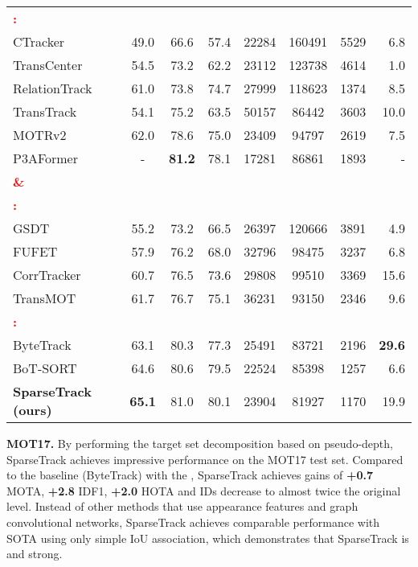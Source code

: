 \begin{table}[t]
{\begin{tabular}{ l | c c c c c c r}
\midrule
\textcolor{red}{\textbf{ :}}\\
CTracker\cite{ctracker}  & 49.0 & 66.6 & 57.4& 22284 & 160491 & 5529 & 6.8\\
TransCenter\cite{transcenter} & 54.5 & 73.2 & 62.2 & 23112 & 123738 & 4614 & 1.0\\
RelationTrack\cite{relationtrack} & 61.0 & 73.8 & 74.7 & 27999 & 118623 & 1374 & 8.5\\
TransTrack\cite{transtrack} & 54.1 & 75.2 & 63.5 & 50157 & 86442 & 3603 & 10.0\\
MOTRv2\cite{motrv2} & 62.0 & 78.6 & 75.0 & 23409 & 94797 & 2619 & 7.5\\
P3AFormer\cite{p3aformer} & - & \textbf{81.2} & 78.1 & 17281 & 86861 &  1893 & -\\

\midrule
\textcolor{red}{\textbf{ \& }}\\
\textcolor{red}{\textbf{ :}}\\
GSDT\cite{GSDT} & 55.2 & 73.2 & 66.5 & 26397 & 120666 & 3891 & 4.9\\
FUFET\cite{FUFET} & 57.9 & 76.2 & 68.0 & 32796 & 98475 & 3237 & 6.8\\
CorrTracker\cite{CorrTrack}& 60.7  & 76.5 & 73.6 & 29808 & 99510 & 3369 & 15.6\\
TransMOT\cite{transmot} & 61.7 & 76.7 & 75.1 & 36231 & 93150 & 2346 & 9.6\\

\midrule
\textcolor{red}{\textbf{  :}}\\
ByteTrack\cite{bytetrack} & 63.1 & 80.3 & 77.3 & 25491 & 83721 & 2196 & \textbf{29.6}\\
BoT-SORT\cite{BoT-SORT} & 64.6 & 80.6 & 79.5 & 22524 & 85398 & 1257 & 6.6\\
\textbf{SparseTrack (ours)} & \textbf{65.1} & 81.0 & 80.1 & 23904 & 81927 & 1170 & 19.9\\
\bottomrule
\end{tabular}
}
\end{table}

\textbf{MOT17.} By performing the target set decomposition based on pseudo-depth, SparseTrack achieves impressive performance on the MOT17 test set. Compared to the baseline (ByteTrack) with the , SparseTrack achieves gains of \textbf{+0.7} MOTA, \textbf{+2.8} IDF1, \textbf{+2.0} HOTA and IDs decrease to almost twice the original level. Instead of other methods that use appearance features and graph convolutional networks, SparseTrack achieves comparable performance with SOTA using only simple IoU association, which demonstrates that SparseTrack is  and strong.

